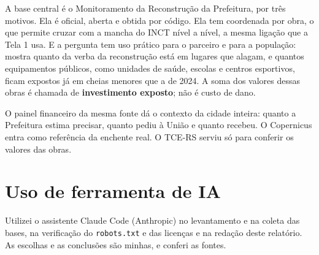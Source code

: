 \documentclass[11pt,a4paper]{article}
\newcommand{\campo}[1]{\texttt{#1}}
\begin{document}
A base central é o Monitoramento da Reconstrução da Prefeitura, por três motivos. Ela é oficial, aberta e obtida por código. Ela tem coordenada por obra, o que permite cruzar com a mancha do INCT nível a nível, a mesma ligação que a Tela 1 usa. E a pergunta tem uso prático para o parceiro e para a população: mostra quanto da verba da reconstrução está em lugares que alagam, e quantos equipamentos públicos, como unidades de saúde, escolas e centros esportivos, ficam expostos já em cheias menores que a de 2024. A soma dos valores dessas obras é chamada de \textbf{investimento exposto}; não é custo de dano.

O painel financeiro da mesma fonte dá o contexto da cidade inteira: quanto a Prefeitura estima precisar, quanto pediu à União e quanto recebeu. O Copernicus entra como referência da enchente real. O TCE-RS serviu só para conferir os valores das obras.

\section{Uso de ferramenta de IA}

Utilizei o assistente Claude Code (Anthropic) no levantamento e na coleta das bases, na verificação do \campo{robots.txt} e das licenças e na redação deste relatório. As escolhas e as conclusões são minhas, e conferi as fontes.
\end{document}
